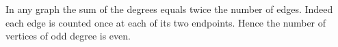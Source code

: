 In any graph the sum of the degrees equals twice the number of edges.
Indeed each edge is counted once at each of its two endpoints.
Hence the number of vertices of odd degree is even.